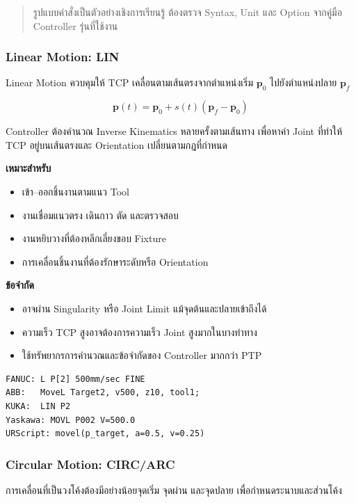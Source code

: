 \begin{quote}
รูปแบบคำสั่งเป็นตัวอย่างเชิงการเรียนรู้ ต้องตรวจ Syntax, Unit และ Option จากคู่มือ Controller รุ่นที่ใช้งาน
\end{quote}

\subsubsection{Linear Motion: LIN}

Linear Motion ควบคุมให้ TCP เคลื่อนตามเส้นตรงจากตำแหน่งเริ่ม $\mathbf{p}_0$ ไปยังตำแหน่งปลาย $\mathbf{p}_f$

\[
\mathbf{p}(t)=\mathbf{p}_0+s(t)(\mathbf{p}_f-\mathbf{p}_0)
\]

Controller ต้องคำนวณ Inverse Kinematics หลายครั้งตามเส้นทาง เพื่อหาค่า Joint ที่ทำให้ TCP อยู่บนเส้นตรงและ Orientation เปลี่ยนตามกฎที่กำหนด

\textbf{เหมาะสำหรับ}

\begin{itemize}
    \item เข้า–ออกชิ้นงานตามแนว Tool
    \item งานเชื่อมแนวตรง เดินกาว ตัด และตรวจสอบ
    \item งานหยิบวางที่ต้องหลีกเลี่ยงขอบ Fixture
    \item การเคลื่อนชิ้นงานที่ต้องรักษาระดับหรือ Orientation
\end{itemize}

\textbf{ข้อจำกัด}

\begin{itemize}
    \item อาจผ่าน Singularity หรือ Joint Limit แม้จุดต้นและปลายเข้าถึงได้
    \item ความเร็ว TCP สูงอาจต้องการความเร็ว Joint สูงมากในบางท่าทาง
    \item ใช้ทรัพยากรการคำนวณและข้อจำกัดของ Controller มากกว่า PTP
\end{itemize}

\begin{verbatim}
FANUC: L P[2] 500mm/sec FINE
ABB:   MoveL Target2, v500, z10, tool1;
KUKA:  LIN P2
Yaskawa: MOVL P002 V=500.0
URScript: movel(p_target, a=0.5, v=0.25)
\end{verbatim}

\subsubsection{Circular Motion: CIRC/ARC}

การเคลื่อนที่เป็นวงโค้งต้องมีอย่างน้อยจุดเริ่ม จุดผ่าน และจุดปลาย เพื่อกำหนดระนาบและส่วนโค้ง

